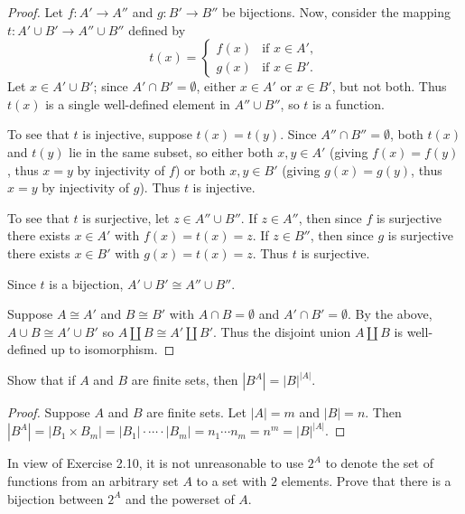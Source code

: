 \begin{proof}
    Let $f : A' \longrightarrow A''$ and $g : B' \longrightarrow B''$ 
        be bijections.
    Now, consider the mapping $t: A' \cup B' \longrightarrow A'' \cup B''$ defined by
    \[t(x) = \begin{cases} f(x) & \text{if } x \in A', \\ g(x) & \text{if } x \in B'. \end{cases}\]
    Let $x \in A' \cup B'$; since $A' \cap B' = \emptyset$, either $x \in A'$
        or $x \in B'$, but not both.
    Thus $t(x)$ is a single well-defined element in $A'' \cup B''$, so $t$ is a function.

    To see that $t$ is injective, suppose $t(x) = t(y)$.
    Since $A'' \cap B'' = \emptyset$, both $t(x)$ and $t(y)$ lie in the same subset,
    so either both $x, y \in A'$ (giving $f(x) = f(y)$, thus $x = y$ by injectivity of $f$)
    or both $x, y \in B'$ (giving $g(x) = g(y)$, thus $x = y$ by injectivity of $g$).
    Thus $t$ is injective.

    To see that $t$ is surjective, let $z \in A'' \cup B''$.
    If $z \in A''$, then since $f$ is surjective there exists $x \in A'$ with $f(x) = t(x) = z$.
    If $z \in B''$, then since $g$ is surjective there exists $x \in B'$ with $g(x) = t(x) = z$.
    Thus $t$ is surjective.

    Since $t$ is a bijection, $A' \cup B' \cong A'' \cup B''$.

    Suppose $A \cong A'$ and $B \cong B'$ with $A \cap B = \emptyset$
    and $A' \cap B' = \emptyset$.
    By the above, $A \cup B \cong A' \cup B'$ so $A \coprod B \cong A' \coprod B'$.
    Thus the disjoint union $A \coprod B$ is well-defined up to isomorphism.
\end{proof}


\begin{tcolorbox}[title=Problem 10, breakable]   
    Show that if $A$ and $B$ are finite sets, then $|B^A| = |B|^{|A|}$.
\end{tcolorbox}

\begin{proof}
    Suppose $A$ and $B$ are finite sets.
    Let $|A| = m$ and $|B| = n$.
    Then $|B^A| = |B_1 \times B_m| = |B_1| \cdot \cdots \cdot  |B_m| = n_1 \cdots n_m = n^m = |B|^{|A|}$.
\end{proof}

\begin{tcolorbox}[title=Problem 11, breakable]  
    In view of Exercise 2.10, it is not unreasonable to use $2^A$ to denote the set 
    of functions from an arbitrary set $A$ to a set with $2$ elements. Prove that there is 
    a bijection between $2^A$ and the powerset of $A$. 
\end{tcolorbox}

